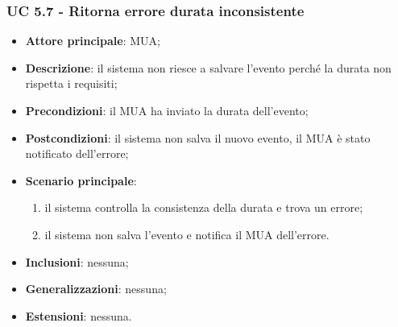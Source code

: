     \subsubsection{UC 5.7 - Ritorna errore durata inconsistente} \label{sec:UC5.7}
    \begin{itemize}
        \item \textbf{Attore principale}: MUA;
        \item \textbf{Descrizione}: il sistema non riesce a salvare l'evento perché la durata non rispetta i requisiti;
        \item \textbf{Precondizioni}: il MUA ha inviato la durata dell'evento;
        \item \textbf{Postcondizioni}: il sistema non salva il nuovo evento, il MUA è stato notificato dell'errore;
        \item \textbf{Scenario principale}:
            \begin{enumerate}
                \item il sistema controlla la consistenza della durata e trova un errore;
                \item il sistema non salva l'evento e notifica il MUA dell'errore.
            \end{enumerate}
        \item \textbf{Inclusioni}: nessuna;
        \item \textbf{Generalizzazioni}: nessuna;
        \item \textbf{Estensioni}: nessuna.
    \end{itemize}